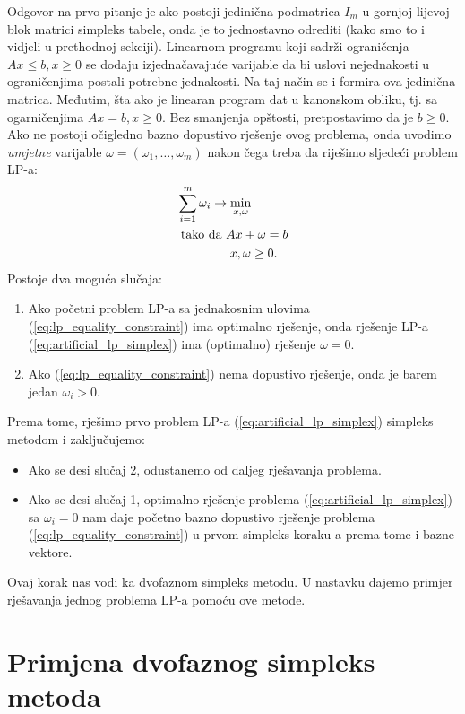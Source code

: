 \documentclass[a4paper, utf8, 11pt, colorlinks]{book}
\begin{document}
 Odgovor na prvo pitanje je ako postoji jedinična podmatrica $I_m$ u gornjoj lijevoj blok matrici simpleks tabele,  onda je to jednostavno odrediti (kako smo to i vidjeli u prethodnoj sekciji). 
 Linearnom programu koji sadrži ograničenja $Ax \leq b, x\geq 0$ se dodaju izjednačavajuće varijable da bi uslovi nejednakosti u ograničenjima postali potrebne jednakosti. Na taj način se i formira ova jedinična matrica. Međutim, šta ako je linearan program dat u kanonskom obliku, tj. sa ogarničenjima $Ax = b, x \geq 0$. Bez smanjenja opštosti, pretpostavimo da je $b \geq 0$. Ako ne postoji očigledno bazno dopustivo rješenje ovog problema, onda uvodimo \emph{umjetne} varijable $\omega = (\omega_1,\ldots, \omega_m)$ nakon čega treba da riješimo sljedeći problem LP-a:
 \begin{align}
      &\sum_{i=1}^m \omega_i \rightarrow \min_{x,\omega} \nonumber \\
      &\mbox{ tako da } A x + \omega = b \nonumber \\
      & \hspace{1.5cm} x, \omega \geq 0. \label{eq:artificial_lp_simplex}
 \end{align}
Postoje dva moguća slučaja:
\begin{enumerate}
    \item Ako početni problem LP-a sa jednakosnim ulovima (\ref{eq:lp_equality_constraint}) 
          ima optimalno rješenje, onda   rješenje LP-a (\ref{eq:artificial_lp_simplex}) ima (optimalno) rješenje $\omega = 0$. 
    \item Ako  (\ref{eq:lp_equality_constraint}) nema dopustivo rješenje, onda je barem jedan $\omega_i > 0$.
\end{enumerate}
 Prema tome, rješimo prvo problem LP-a  (\ref{eq:artificial_lp_simplex}) simpleks metodom i zaključujemo:
 \begin{itemize}
      \item Ako se desi slučaj 2, odustanemo od daljeg rješavanja problema.
      \item Ako se desi slučaj 1, optimalno rješenje problema (\ref{eq:artificial_lp_simplex}) sa $\omega_i=0$ nam daje početno bazno dopustivo rješenje problema (\ref{eq:lp_equality_constraint}) u prvom simpleks koraku a prema tome i bazne vektore. 
 \end{itemize} 
 Ovaj korak nas vodi ka dvofaznom simpleks metodu. U nastavku dajemo primjer rješavanja jednog problema LP-a pomoću ove metode.      
      
 \section{Primjena dvofaznog simpleks metoda}     
 
\end{document}
